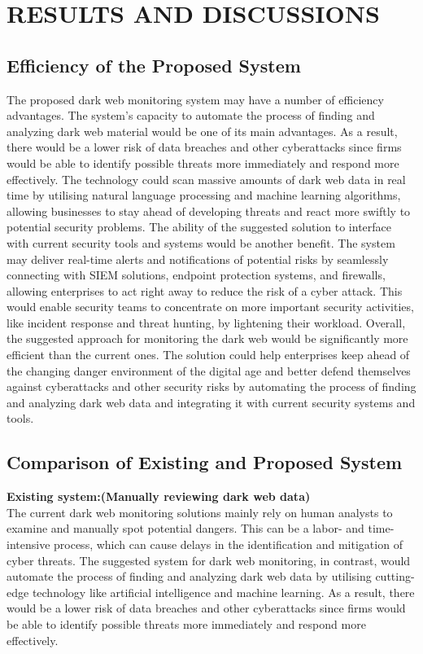 \documentclass[10pt]{report}
\begin{document}
\chapter{RESULTS AND DISCUSSIONS}
\linespread{1.5}
\section{Efficiency of the Proposed System}

The proposed dark web monitoring system may have a number of efficiency advantages. The system's capacity to automate the process of finding and analyzing dark web material would be one of its main advantages. As a result, there would be a lower risk of data breaches and other cyberattacks since firms would be able to identify possible threats more immediately and respond more effectively. The technology could scan massive amounts of dark web data in real time by utilising natural language processing and machine learning algorithms, allowing businesses to stay ahead of developing threats and react more swiftly to potential security problems.
The ability of the suggested solution to interface with current security tools and systems would be another benefit. The system may deliver real-time alerts and notifications of potential risks by seamlessly connecting with SIEM solutions, endpoint protection systems, and firewalls, allowing enterprises to act right away to reduce the risk of a cyber attack. This would enable security teams to concentrate on more important security activities, like incident response and threat hunting, by lightening their workload.
Overall, the suggested approach for monitoring the dark web would be significantly more efficient than the current ones. The solution could help enterprises keep ahead of the changing danger environment of the digital age and better defend themselves against cyberattacks and other security risks by automating the process of finding and analyzing dark web data and integrating it with current security systems and tools.

\section{Comparison of Existing and Proposed System}
\textbf{Existing system:(Manually reviewing dark web data)}\\The current dark web monitoring solutions mainly rely on human analysts to examine and manually spot potential dangers. This can be a labor- and time-intensive process, which can cause delays in the identification and mitigation of cyber threats. The suggested system for dark web monitoring, in contrast, would automate the process of finding and analyzing dark web data by utilising cutting-edge technology like artificial intelligence and machine learning. As a result, there would be a lower risk of data breaches and other cyberattacks since firms would be able to identify possible threats more immediately and respond more effectively.
\end{document}
